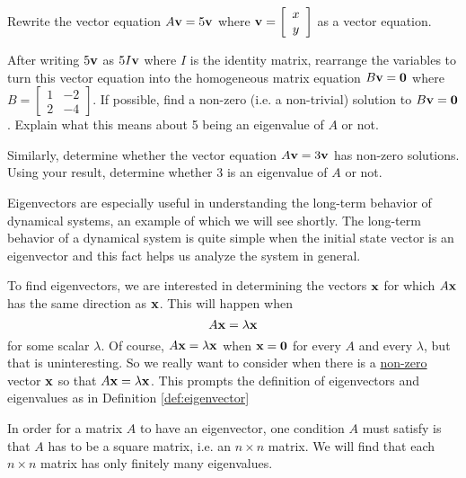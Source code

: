 \begin{pa}
\ba
	\item Rewrite the vector equation $A\mathbf{v}=5\mathbf{v}$ where $\mathbf{v} = \left[ \begin{array}{c} x \\y \end{array} \right]$ as a vector equation.
	
	
	\item After writing $5\mathbf{v}$ as $5I\mathbf{v}$ where $I$ is the identity matrix, rearrange the variables to turn this vector equation into the homogeneous matrix equation $B\mathbf{v}=\mathbf{0}$ where $B=\left[ \begin{array}{cr} 1 & -2\\2 & -4 \end{array} \right]$. If possible, find a non-zero (i.e. a non-trivial) solution to $B\mathbf{v}=\mathbf{0}$. Explain what this means about 5 being an eigenvalue of $A$ or not. 


\item Similarly, determine whether the vector equation $A\mathbf{v}=3\mathbf{v}$ has non-zero solutions. Using your result, determine whether 3 is an eigenvalue of $A$ or not.

\ea

\ee
\end{pa}



Eigenvectors are especially useful in understanding the long-term behavior of dynamical systems, an example of which we will see shortly. The long-term behavior of a dynamical system is quite simple when the initial state vector is an eigenvector and this fact helps us analyze the system in general. 

To find eigenvectors, we are interested in determining the vectors $\mathbf{x}$ for which $A\mathbf{x}$ has the same direction as $\mathbf{x}$. This will happen when
\[A\mathbf{x} = \lambda \mathbf{x}\]
for some scalar $\lambda$. Of course, $A\mathbf{x} = \lambda \mathbf{x}$ when $\mathbf{x} = \mathbf{0}$ for every $A$ and every $\lambda$, but that is uninteresting. So we really want to consider when there is a \underline{non-zero} vector $\mathbf{x}$ so that $A\mathbf{x} = \lambda \mathbf{x}$. This prompts the definition of eigenvectors and eigenvalues as in Definition \ref{def:eigenvector} 


In order for a matrix $A$ to have an eigenvector, one condition $A$ must satisfy is that $A$ has to be a square matrix, i.e. an $n \times n$ matrix. We will find that each $n\times n$ matrix has only finitely many eigenvalues.

